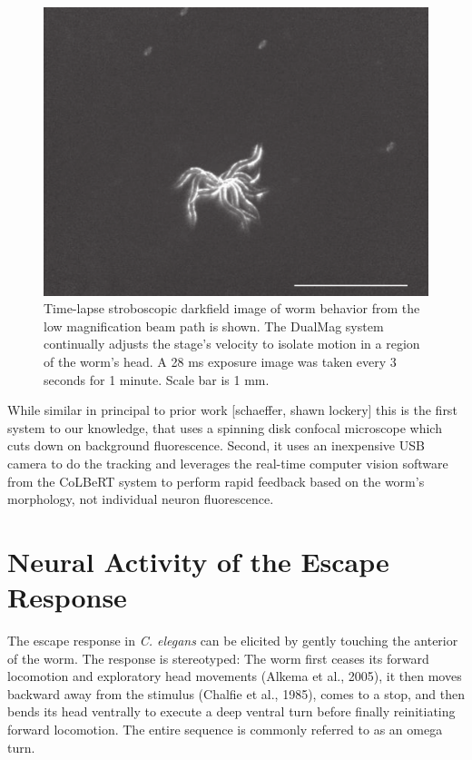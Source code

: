 \begin{figure}  %
\includegraphics[width=\textwidth]{figures/omegaTimeLapse}
\caption[Time lapse image of behavior from low magnification beam path.]{Time-lapse stroboscopic darkfield image of worm behavior from the low magnification beam path is shown. The DualMag system continually adjusts the stage's velocity to isolate motion in a region of the worm's head. A 28 ms exposure image was taken every 3 seconds for 1 minute. Scale bar is 1 mm.
\label{fig:omegaTimeLapse}}
\end{figure}




While similar in principal to prior work [schaeffer, shawn lockery] this is the first system to our knowledge, that uses a  spinning disk confocal microscope which cuts down on background fluorescence. Second, it uses an inexpensive USB camera to do the tracking and  leverages the real-time computer vision software from the CoLBeRT system \citep{leifer_optogenetic_2011} to perform rapid feedback based on the worm's morphology, not individual neuron fluorescence.

















\section{Neural Activity of the Escape Response}
The escape response in \textit{C. elegans} can be elicited by gently touching the anterior of the worm. The response is  stereotyped: The worm first ceases its forward locomotion and exploratory head movements (Alkema et al., 2005), it then moves backward away from the stimulus (Chalfie et al., 1985), comes to a stop, and then bends its head ventrally to execute a deep ventral turn before finally reinitiating forward locomotion.  The entire sequence is commonly referred to as an omega turn. 


